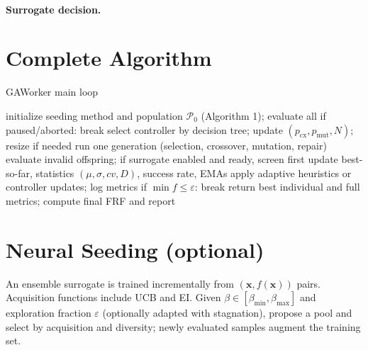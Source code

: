 \documentclass[12pt,a4paper]{article}
\begin{document}
\paragraph{Surrogate decision.}
\begin{center}
\end{center}

\section{Complete Algorithm}
\begin{algorithm}[H]
\caption{GAWorker main loop}
\begin{algorithmic}[1]
\State initialize seeding method and population $\mathcal{P}_0$ (Algorithm 1); evaluate all
\State if paused/aborted: break
\State select controller by decision tree; update $(p_{\text{cx}},p_{\text{mut}},N)$; resize if needed
\State run one generation (selection, crossover, mutation, repair)
\State evaluate invalid offspring; if surrogate enabled and ready, screen first
\State update best-so-far, statistics $(\mu,\sigma,cv,D)$, success rate, EMAs
\State apply adaptive heuristics or controller updates; log metrics
\State if $\min f \le \varepsilon$: break
\EndFor
\State return best individual and full metrics; compute final FRF and report
\end{algorithmic}
\end{algorithm}

\section{Neural Seeding (optional)}\label{sec:neural}
An ensemble surrogate is trained incrementally from $(\bm{x},f(\bm{x}))$ pairs. Acquisition functions include UCB and EI. Given $\beta\in[\beta_{\min},\beta_{\max}]$ and exploration fraction $\varepsilon$ (optionally adapted with stagnation), propose a pool and select by acquisition and diversity; newly evaluated samples augment the training set.
\end{document}
